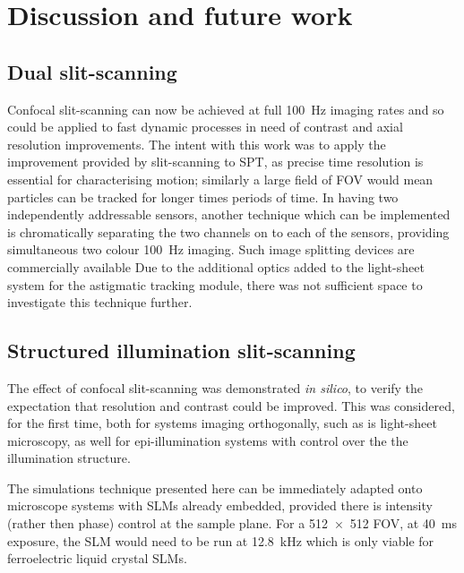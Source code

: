 \section{Discussion and future work}

\subsection{Dual \gls{slit-scanning}}

Confocal \gls{slit-scanning} can now be achieved at full \SI{100}{\hertz} imaging rates and so could be applied to fast dynamic processes in need of contrast and axial resolution improvements.
The intent with this work was to apply the improvement provided by \gls{slit-scanning} to \gls{SPT}, as precise time resolution is essential for characterising motion; similarly a large field of \gls{FOV} would mean particles can be tracked for longer times periods of time.
In having two independently addressable sensors, another technique which can be implemented is chromatically separating the two channels on to each of the sensors, providing simultaneous two colour \SI{100}{\hertz} imaging.
Such image splitting devices are commercially available\cite{EmissionImageSplitter}%
Due to the additional optics added to the light-sheet system for the astigmatic tracking module, there was not sufficient space to investigate this technique further.

\subsection{Structured illumination \gls{slit-scanning}}

The effect of confocal \gls{slit-scanning} was demonstrated \emph{in silico}, to verify the expectation that resolution and contrast could be improved. %
This was considered, for the first time, both for systems imaging orthogonally, such as is light-sheet microscopy, as well for epi-illumination systems with control over the the illumination structure.

The simulations technique presented here can be immediately adapted onto microscope systems with \gls{SLM}s already embedded, provided there is intensity (rather then phase) control at the sample plane.
For a \SI{512x512}{} \gls{FOV}, at \SI{40}{\milli\second} exposure, the \gls{SLM} would need to be run at \SI{12.8}{\kilo\hertz} which is only viable for ferroelectric liquid crystal SLMs.

